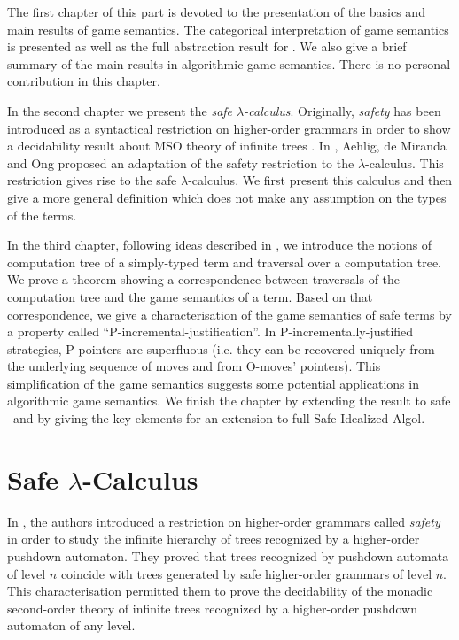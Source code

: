\usepackage{bbm,latexsym}
\usepackage{tabularx}
\usepackage{bigcenter}       
\usepackage[draft]{graphicx}

The first chapter of this part is devoted to the presentation of the
basics and main results of game semantics. The categorical
interpretation of game semantics is presented as well as the full
abstraction result for \pcf. We also give a brief summary of the
main results in algorithmic game semantics. There is no personal
contribution in this chapter.

In the second chapter we present the \emph{safe $\lambda$-calculus}.
Originally, \emph{safety} has been introduced as a syntactical
restriction on higher-order grammars in order to show a decidability
result about MSO theory of infinite trees \citep{KNU02}. In
\cite{safety-mirlong2004}, Aehlig, de Miranda and Ong  proposed an
adaptation of the safety restriction to the $\lambda$-calculus. This
restriction gives rise to the safe $\lambda$-calculus. We first
present this calculus and then give a more general definition which
does not make any assumption on the types of the terms.

In the third chapter, following ideas described in
\cite{OngLics2006}, we introduce the notions of computation tree of
a simply-typed term and traversal over a computation tree. We prove
a theorem showing a correspondence between traversals of the
computation tree and the game semantics of a term. Based on that
correspondence, we give a characterisation of the game semantics of
safe terms by a property called ``P-incremental-justification''. In
P-incrementally-justified strategies, P-pointers are superfluous (i.e.
they can be recovered uniquely from the underlying sequence of
moves and from O-moves' pointers). This simplification of the game semantics suggests some potential applications in algorithmic game semantics. We finish the
chapter by extending the result to safe \pcf\ and by giving the key
elements for an extension to full Safe Idealized Algol.




\chapter{Safe $\lambda$-Calculus}
In \cite{KNU02}, the authors introduced a restriction on
higher-order grammars called \emph{safety} in order to study the
infinite hierarchy of trees recognized by a higher-order pushdown
automaton. They proved that trees recognized by pushdown automata of
level $n$ coincide with trees generated by safe higher-order
grammars of level $n$. This characterisation permitted them to prove
the decidability of the monadic second-order theory of infinite
trees recognized by a higher-order pushdown automaton of any level.

